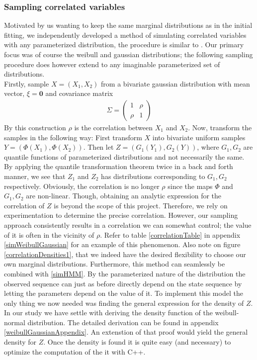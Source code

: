 \subsubsection{Sampling correlated variables}
Motivated by us wanting to keep the same marginal distributions as in the initial fitting, we independently developed a method of simulating correlated variables with any parameterized distribution, the procedure is similar to \cite{thomasWard}. Our primary focus was of course the weibull and gaussian distributions; the following sampling procedure does however extend to any imaginable parameterized set of distributions.\\ Firstly, sample $X = (X_1, X_2)$ from a bivariate gaussian distribution with mean vector, $\xi = \mathbf{0}$ and covariance matrix 
\begin{align}\Sigma = \begin{pmatrix}
    1 & \rho \\
    \rho & 1
\end{pmatrix}
\end{align}
By this construction $\rho$ is the correlation between $X_1$ and $X_2$. Now, transform the samples in the following way: First transform $X$ into bivariate uniform samples $Y = (\Phi(X_1),\Phi(X_2))$. Then let $Z = (G_1(Y_1), G_2(Y))$, where $G_1, G_2$ are quantile functions of parameterized distributions and not necessarily the same. By applying the quantile transformation theorem twice in a back and forth manner, we see that $Z_1$ and $Z_2$ has distributions corresponding to $G_1, G_2$ respectively. Obviously, the correlation is no longer $\rho$ since the maps $\Phi$ and $G_1, G_2$ are non-linear. Though, obtaining an analytic expression for the correlation of $Z$ is beyond the scope of this project. Therefore, we rely on experimentation to determine the precise correlation. However, our sampling approach consistently results in a correlation we can somewhat control; the value of it is often in the vicinity of $\rho$. Refer to table \ref{correlationTable} in appendix \ref{simWeibullGaussian} for an example of this phenomenon. Also note on figure \ref{correlationDensities1}, that we indeed have the desired flexibility to choose our own marginal distributions. Furthermore, this method can seamlessly be combined with \ref{simHMM}. By the parameterized nature of the distribution the observed sequence can just as before directly depend on the state sequence by letting the parameters depend on the value of it. To implement this model the only thing we now needed was finding the general expression for the density of $Z$. In our study we have settle with deriving the density function of the weibull-normal distribution. The detailed derivation can be found in appendix \ref{weibullGaussianAppendix}. An extenstion of that proof would yield the general density for $Z$. Once the density is found it is quite easy (and necessary) to optimize the computation of the it with C++\cite{Rcpp}.
